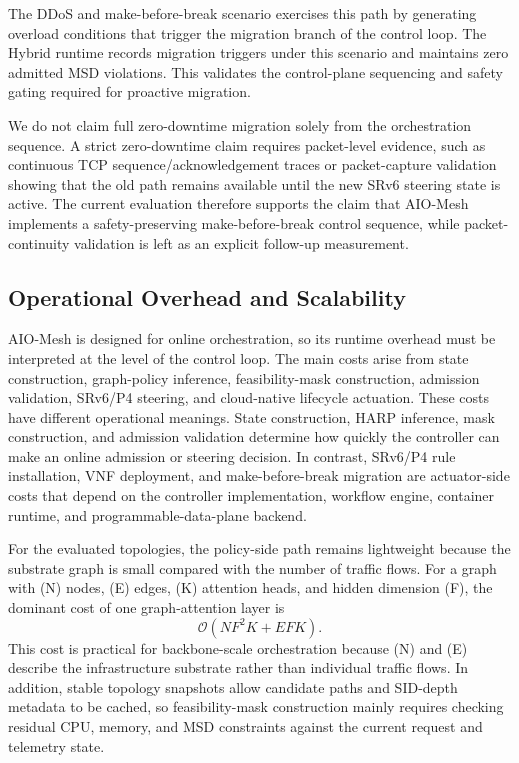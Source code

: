 \documentclass[final,5p]{elsarticle}
\begin{document}
The DDoS and make-before-break scenario exercises this path by generating overload conditions that trigger the migration branch of the control loop. The Hybrid runtime records migration triggers under this scenario and maintains zero admitted MSD violations. This validates the control-plane sequencing and safety gating required for proactive migration.

We do not claim full zero-downtime migration solely from the orchestration sequence. A strict zero-downtime claim requires packet-level evidence, such as continuous TCP sequence/acknowledgement traces or packet-capture validation showing that the old path remains available until the new SRv6 steering state is active. The current evaluation therefore supports the claim that AIO-Mesh implements a safety-preserving make-before-break control sequence, while packet-continuity validation is left as an explicit follow-up measurement.

\subsection{Operational Overhead and Scalability}
\label{subsec:overhead_scalability}
AIO-Mesh is designed for online orchestration, so its runtime overhead must be interpreted at the level of the control loop. The main costs arise from state construction, graph-policy inference, feasibility-mask construction, admission validation, SRv6/P4 steering, and cloud-native lifecycle actuation. These costs have different operational meanings. State construction, HARP inference, mask construction, and admission validation determine how quickly the controller can make an online admission or steering decision. In contrast, SRv6/P4 rule installation, VNF deployment, and make-before-break migration are actuator-side costs that depend on the controller implementation, workflow engine, container runtime, and programmable-data-plane backend.

For the evaluated topologies, the policy-side path remains lightweight because the substrate graph is small compared with the number of traffic flows. For a graph with (N) nodes, (E) edges, (K) attention heads, and hidden dimension (F), the dominant cost of one graph-attention layer is
\begin{equation}
\mathcal{O}(N F^2 K + E F K).
\end{equation}
This cost is practical for backbone-scale orchestration because (N) and (E) describe the infrastructure substrate rather than individual traffic flows. In addition, stable topology snapshots allow candidate paths and SID-depth metadata to be cached, so feasibility-mask construction mainly requires checking residual CPU, memory, and MSD constraints against the current request and telemetry state.
\end{document}
